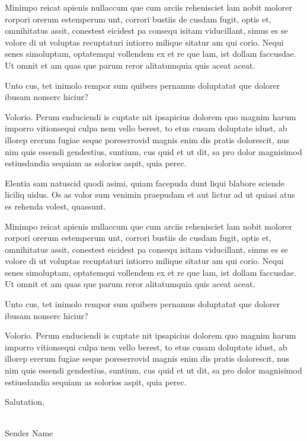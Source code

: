 \documentclass[
]{ImperialLetterhead}
\begin{document}
Minimpo reicat apienis nullaccum que cum arciis rehenisciet lam nobit molorer rorpori orerum estemperum unt, corrori bustiis de cusdam fugit, optis et, omnihitatus assit, conestest eicidest pa consequ isitam viducillant, simus es se volore di ut voluptas recuptaturi intiorro milique sitatur am qui corio. Nequi senes simoluptam, optatemqui vollendem ex et re que lam, ist dollam faccusdae. Ut omnit et am quas que parum reror alitatumquia quis aceat aceat.

Unto cus, tet inimolo rempor sum quibers pernamus doluptatat que dolorer ibusam nonserc hiciur?

Volorio. Perum enduciendi is cuptate nit ipsapicius dolorem quo magnim harum imporro vitionsequi culpa nem vello berest, to etus cusam doluptate idust, ab illorep ererum fugiae seque poreserrovid magnis enim dis pratis dolorescit, nus nim quis essendi gendestius, suntium, cus quid et ut dit, sa pro dolor magnisimod estiusdandia sequiam as solorios aspit, quia perec.

Elentia sam natuscid quodi asimi, quiam facepuda dunt liqui blabore sciende liciliq uidus. Os as volor sum venimin praepudam et aut lictur ad ut quiasi atus es rehenda volest, quassunt.

Minimpo reicat apienis nullaccum que cum arciis rehenisciet lam nobit molorer rorpori orerum estemperum unt, corrori bustiis de cusdam fugit, optis et, omnihitatus assit, conestest eicidest pa consequ isitam viducillant, simus es se volore di ut voluptas recuptaturi intiorro milique sitatur am qui corio. Nequi senes simoluptam, optatemqui vollendem ex et re que lam, ist dollam faccusdae. Ut omnit et am quas que parum reror alitatumquia quis aceat aceat.

Unto cus, tet inimolo rempor sum quibers pernamus doluptatat que dolorer ibusam nonserc hiciur?

Volorio. Perum enduciendi is cuptate nit ipsapicius dolorem quo magnim harum imporro vitionsequi culpa nem vello berest, to etus cusam doluptate idust, ab illorep ererum fugiae seque poreserrovid magnis enim dis pratis dolorescit, nus nim quis essendi gendestius, suntium, cus quid et ut dit, sa pro dolor magnisimod estiusdandia sequiam as solorios aspit, quia perec.

Salutation,

\\ %
Sender Name

\end{document}
